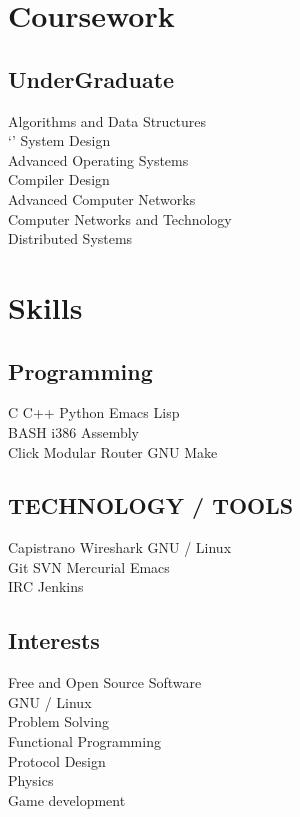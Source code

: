 \documentclass[letterpaper]{deedy-resume} %
\begin{document}
\begin{minipage}[t]{0.33\textwidth}
\section{Coursework}
\subsection{UnderGraduate}
Algorithms and Data Structures \\`'
System Design \\
Advanced Operating Systems \\
Compiler Design \\
Advanced Computer Networks \\
Computer Networks and Technology \\
Distributed Systems \\
\sectionspace %
\section{Skills}
\subsection{Programming}
C \textbullet{} C++ \textbullet{} Python \textbullet{} Emacs Lisp\\
BASH \textbullet{} i386 Assembly \\
Click Modular Router  \textbullet{} GNU Make \\
\sectionspace %
\subsection{TECHNOLOGY / TOOLS}
Capistrano \textbullet{} Wireshark \textbullet{} GNU / Linux \\ 
Git \textbullet{} SVN \textbullet{} Mercurial \textbullet{}  Emacs \\
IRC \textbullet{} Jenkins 
\sectionspace %
\subsection{Interests}
Free and Open Source Software \\
GNU / Linux \\
Problem Solving \\
Functional Programming \\
Protocol Design \\
Physics \\
Game development
\sectionspace %

\end{minipage} %
\end{document}
